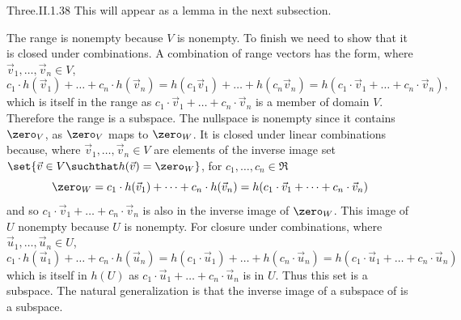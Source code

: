 \begin{ans}{Three.II.1.38}
 This will appear as a lemma in the next subsection.
      \begin{exparts}
        \partsitem The range is nonempty because \( V \) is nonempty.
          To finish we need to show that it is closed under combinations.
          A combination of range vectors has the form,
          where \( \vec{v}_1,\dots,\vec{v}_n\in V \),
          \begin{equation*}
            c_1\cdot h(\vec{v}_1)+\dots+c_n\cdot h(\vec{v}_n)
            =
            h(c_1\vec{v}_1)+\dots+h(c_n\vec{v}_n)
            =
            h(c_1\cdot \vec{v}_1+\dots+c_n\cdot \vec{v}_n),
          \end{equation*}
          which is itself in the range as
          \( c_1\cdot \vec{v}_1+\dots+c_n\cdot \vec{v}_n \) is a member of
          domain \( V \).
          Therefore the range is a subspace.
        \partsitem The nullspace is nonempty since it contains $\zero_V$, as
          \( \zero_V \) maps to \( \zero_W \).
          It is closed under linear combinations because, where
          \( \vec{v}_1,\dots,\vec{v}_n\in V \) are elements
          of the inverse image set
          \( \set{\vec{v}\in V\suchthat h(\vec{v})=\zero_W} \),
          for \( c_1,\ldots,c_n\in\Re \)
          \begin{equation*}
            \zero_W=c_1\cdot h(\vec{v}_1)+\dots+c_n\cdot h(\vec{v}_n)
            =h(c_1\cdot \vec{v}_1+\dots+c_n\cdot \vec{v}_n)
          \end{equation*}
          and so \( c_1\cdot \vec{v}_1+\dots+c_n\cdot \vec{v}_n \) is also in
          the inverse image of \( \zero_W \).
        \partsitem This image of \( U \) nonempty because \( U \) is nonempty.
          For closure under combinations,
          where \( \vec{u}_1,\ldots,\vec{u}_n\in U \),
          \begin{equation*}
            c_1\cdot h(\vec{u}_1)+\dots+c_n\cdot h(\vec{u}_n)
            =
            h(c_1\cdot \vec{u}_1)+\dots+h(c_n\cdot \vec{u}_n)
            =
            h(c_1\cdot \vec{u}_1+\dots+c_n\cdot \vec{u}_n)
          \end{equation*}
          which is itself in \( h(U) \) as
          \( c_1\cdot \vec{u}_1+\dots+c_n\cdot \vec{u}_n \) is in \( U \).
          Thus this set is a subspace.
        \partsitem The natural generalization is that the inverse image of a
          subspace of is a subspace.


\end{exparts}
\end{ans}
